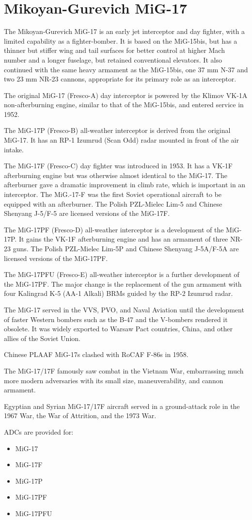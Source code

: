 \section*{Mikoyan-Gurevich MiG-17}

The Mikoyan-Gurevich MiG-17 is an early jet interceptor and day fighter, with a limited capability as a fighter-bomber. It is based on the MiG-15bis, but has a thinner but stiffer wing and tail surfaces for better control at higher Mach number and a longer fuselage, but retained conventional elevators. It also continued with the same heavy armament as the MiG-15bis, one 37 mm N-37 and two 23 mm NR-23 cannons, appropriate for its primary role as an interceptor.

The original MiG-17 (Fresco-A) day interceptor is powered by the Klimov VK-1A non-afterburning engine, similar to that of the MiG-15bis, and entered service in 1952. 

The MiG-17P (Fresco-B) all-weather interceptor is derived from the original MiG-17. It has an RP-1 Izumrud (Scan Odd) radar mounted in front of the air intake.

The MiG-17F (Fresco-C) day fighter was introduced in 1953. It has a VK-1F afterburning engine but was otherwise almost identical to the MiG-17. The afterburner gave a dramatic improvement in climb rate, which is important in an interceptor. The MiG.-17-F was the first Soviet operational aircraft to be equipped with an afterburner. The Polish PZL-Mielec Lim-5 and Chinese Shenyang J-5/F-5 are licensed versions of the MiG-17F.

The MiG-17PF (Fresco-D) all-weather interceptor is a development of the MiG-17P. It gains the VK-1F afterburning engine and has an armament of three NR-23 guns. The Polish PZL-Mielec Lim-5P and Chinese Shenyang J-5A/F-5A are licensed versions of the MiG-17PF.

The MiG-17PFU (Fresco-E) all-weather interceptor is a further development of the MiG-17PF. The major change is the replacement of the gun armament with four Kalingrad K-5 (AA-1 Alkali) BRMs guided by the RP-2 Izumrud radar.

The MiG-17 served in the VVS, PVO, and Naval Aviation until the development of faster Western bombers such as the B-47 and the V-bombers rendered it obsolete. It was widely exported to Warsaw Pact countries, China, and other allies of the Soviet Union.

Chinese PLAAF MiG-17s clashed with RoCAF F-86s in 1958.

The MiG-17/17F famously saw combat in the Vietnam War, embarrassing much more modern adversaries with its small size, maneuverability, and cannon armament. 

Egyptian and Syrian MiG-17/17F aircraft served in a ground-attack role in the 1967 War, the War of Attrition, and the 1973 War.

ADCs are provided for:
\begin{itemize}
    \item MiG-17
    \item MiG-17F
    \item MiG-17P
    \item MiG-17PF
    \item MiG-17PFU
\end{itemize}